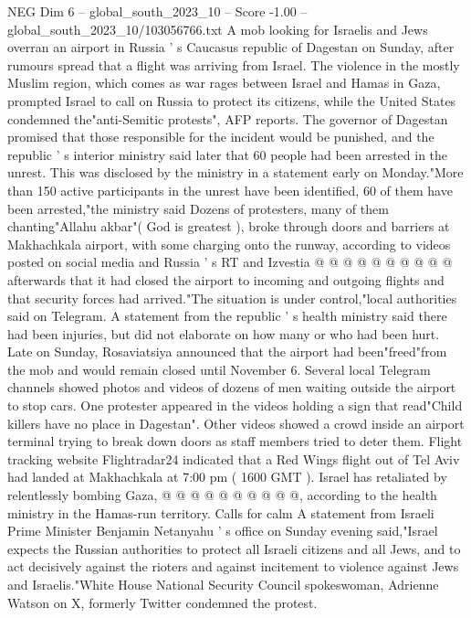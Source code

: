 \begin{textsample}{NEG Dim 6 – global\_south\_2023\_10 – Score -1.00 – global\_south\_2023\_10/103056766.txt}  \label{ex:f6_neg_211}
A mob looking for Israelis and Jews overran an airport in Russia ' s Caucasus republic of Dagestan on Sunday, after rumours spread that a flight was arriving from Israel.
The violence in the mostly Muslim region, which comes as war rages between Israel and Hamas in Gaza, prompted Israel to call on Russia to protect its citizens, while the United States condemned the"anti-Semitic protests", AFP reports.
The governor of Dagestan promised that those responsible for the incident would be punished, and the republic ' s interior ministry said later that 60 people had been arrested in the unrest.
This was disclosed by the ministry in a statement early on Monday."More than 150 active participants in the unrest have been identified, 60 of them have been arrested,"the ministry said Dozens of protesters, many of them chanting"Allahu akbar"( God is greatest ), broke through doors and barriers at Makhachkala airport, with some charging onto the runway, according to videos posted on social media and Russia ' s RT and Izvestia @ @ @ @ @ @ @ @ @ @ afterwards that it had closed the airport to incoming and outgoing flights and that security forces had arrived."The situation is under control,"local authorities said on Telegram.
A statement from the republic ' s health ministry said there had been injuries, but did not elaborate on how many or who had been hurt.
Late on Sunday, Rosaviatsiya announced that the airport had been"freed"from the mob and would remain closed until November 6.
Several local Telegram channels showed photos and videos of dozens of men waiting outside the airport to stop cars.
One protester appeared in the videos holding a sign that read"Child killers have no place in Dagestan".
Other videos showed a crowd inside an airport terminal trying to break down doors as staff members tried to deter them.
Flight tracking website Flightradar24 indicated that a Red Wings flight out of Tel Aviv had landed at Makhachkala at 7:00 pm ( 1600 GMT ).
Israel has retaliated by relentlessly bombing Gaza, @ @ @ @ @ @ @ @ @ @, according to the health ministry in the Hamas-run territory.
Calls for calm A statement from Israeli Prime Minister Benjamin Netanyahu ' s office on Sunday evening said,"Israel expects the Russian authorities to protect all Israeli citizens and all Jews, and to act decisively against the rioters and against incitement to violence against Jews and Israelis."White House National Security Council spokeswoman, Adrienne Watson on X, formerly Twitter condemned the protest.

\end{textsample}
